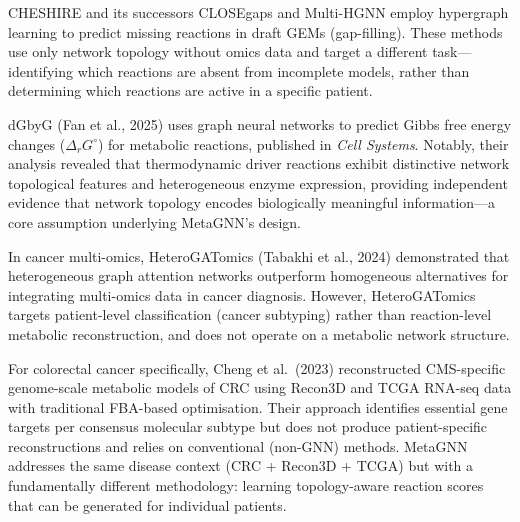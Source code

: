 \documentclass[12pt,a4paper]{article}
\begin{document}
CHESHIRE \cite{Xin2023} and its successors CLOSEgaps \cite{CLOSEgaps2024} and Multi-HGNN \cite{MultiHGNN2025} employ hypergraph learning to predict missing reactions in draft GEMs (gap-filling). These methods use only network topology without omics data and target a different task---identifying which reactions are absent from incomplete models, rather than determining which reactions are active in a specific patient.

dGbyG (Fan et al., 2025) \cite{Fan2025} uses graph neural networks to predict Gibbs free energy changes ($\Delta_r G^\circ$) for metabolic reactions, published in \textit{Cell Systems}. Notably, their analysis revealed that thermodynamic driver reactions exhibit distinctive network topological features and heterogeneous enzyme expression, providing independent evidence that network topology encodes biologically meaningful information---a core assumption underlying MetaGNN's design.

In cancer multi-omics, HeteroGATomics (Tabakhi et al., 2024) \cite{Tabakhi2024} demonstrated that heterogeneous graph attention networks outperform homogeneous alternatives for integrating multi-omics data in cancer diagnosis. However, HeteroGATomics targets patient-level classification (cancer subtyping) rather than reaction-level metabolic reconstruction, and does not operate on a metabolic network structure.

For colorectal cancer specifically, Cheng et al.\ (2023) \cite{Cheng2023} reconstructed CMS-specific genome-scale metabolic models of CRC using Recon3D and TCGA RNA-seq data with traditional FBA-based optimisation. Their approach identifies essential gene targets per consensus molecular subtype but does not produce patient-specific reconstructions and relies on conventional (non-GNN) methods. MetaGNN addresses the same disease context (CRC + Recon3D + TCGA) but with a fundamentally different methodology: learning topology-aware reaction scores that can be generated for individual patients.
\end{document}
